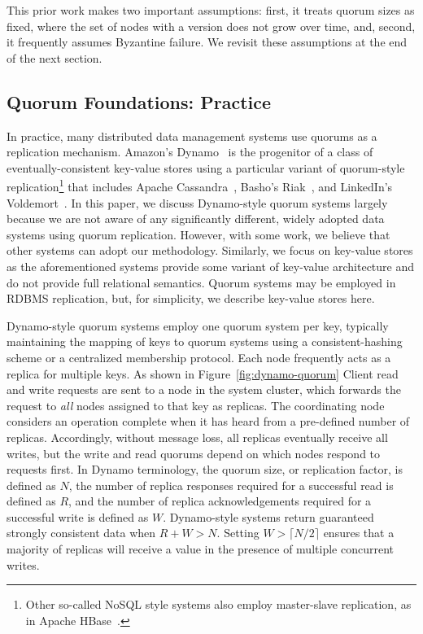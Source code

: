 \documentclass{vldb}
\begin{document}
This prior work makes two important assumptions: first, it treats
quorum sizes as fixed, where the set of nodes with a version does not
grow over time, and, second, it frequently assumes Byzantine failure.
We revisit these assumptions at the end of the next section.

\subsection{Quorum Foundations: Practice}
\label{sec:practice}

In practice, many distributed data management systems use quorums as a
replication mechanism. Amazon's Dynamo~\cite{dynamo} is the progenitor
of a class of eventually-consistent key-value stores using a
particular variant of quorum-style replication\footnote{Other
  so-called NoSQL style systems also employ master-slave replication,
  as in Apache HBase~\cite{hbase}.} that includes Apache
Cassandra~\cite{cassandra, cassandra-sigmod}, Basho's
Riak~\cite{riak}, and LinkedIn's Voldemort~\cite{voldemort,
  voldemortpub}.  In this paper, we discuss Dynamo-style quorum
systems largely because we are not aware of any significantly
different, widely adopted data systems using quorum replication.
However, with some work, we believe that other systems can adopt our
methodology.  Similarly, we focus on key-value stores as the
aforementioned systems provide some variant of key-value architecture
and do not provide full relational semantics.  Quorum systems may be
employed in RDBMS replication, but, for simplicity, we describe
key-value stores here.

Dynamo-style quorum systems employ one quorum system per key,
typically maintaining the mapping of keys to quorum systems using a
consistent-hashing scheme or a centralized membership protocol. Each
node frequently acts as a replica for multiple keys.  As shown in
Figure~\ref{fig:dynamo-quorum} Client read and write requests are sent
to a node in the system cluster, which forwards the request to
\textit{all} nodes assigned to that key as replicas.  The coordinating
node considers an operation complete when it has heard from a
pre-defined number of replicas.  Accordingly, without message loss,
all replicas eventually receive all writes, but the write and read
quorums depend on which nodes respond to requests first.  In Dynamo
terminology, the quorum size, or replication factor, is defined as
$N$, the number of replica responses required for a successful read is
defined as $R$, and the number of replica acknowledgements required
for a successful write is defined as $W$. Dynamo-style systems return
guaranteed strongly consistent data when $R+W > N$.  Setting $W>\lceil
N/2 \rceil$ ensures that a majority of replicas will receive a value
in the presence of multiple concurrent writes.
\end{document}
